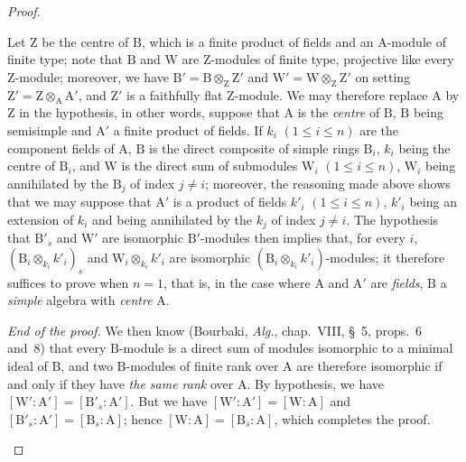\begin{proof}
\begin{env}[2.5.8.8]
Let $\mathrm{Z}$ be the centre of $\mathrm{B}$, which is a finite product
of fields and an $\mathrm{A}$-module of finite type; note that
$\mathrm{B}$ and $\mathrm{W}$ are $\mathrm{Z}$-modules of finite type,
projective like every $\mathrm{Z}$-module; moreover, we have
$\mathrm{B}'=\mathrm{B}\otimes_{\mathrm{Z}}\mathrm{Z}'$ and
$\mathrm{W}'=\mathrm{W}\otimes_{\mathrm{Z}}\mathrm{Z}'$ on setting
$\mathrm{Z}'=\mathrm{Z}\otimes_{\mathrm{A}}\mathrm{A}'$, and
$\mathrm{Z}'$ is a faithfully flat $\mathrm{Z}$-module. We may therefore
replace $\mathrm{A}$ by $\mathrm{Z}$ in the hypothesis, in other words,
suppose that $\mathrm{A}$ is the \emph{centre} of $\mathrm{B}$,
$\mathrm{B}$ being semisimple and $\mathrm{A}'$ a finite product of
fields. If $k_i$ $(1\leq i\leq n)$ are the component fields of
$\mathrm{A}$, $\mathrm{B}$ is the direct composite of simple rings
$\mathrm{B}_i$, $k_i$ being the centre of $\mathrm{B}_i$, and
$\mathrm{W}$ is the direct sum of submodules $\mathrm{W}_i$
$(1\leq i\leq n)$, $\mathrm{W}_i$ being annihilated by the $\mathrm{B}_j$
of index $j\neq i$; moreover, the reasoning made above shows that we may
suppose that $\mathrm{A}'$ is a product of fields $k'_i$
$(1\leq i\leq n)$, $k'_i$ being an extension of $k_i$ and being
annihilated by the $k_j$ of index $j\neq i$. The hypothesis that
$\mathrm{B}'_s$ and $\mathrm{W}'$ are isomorphic $\mathrm{B}'$-modules
then implies that, for every $i$,
$(\mathrm{B}_i\otimes_{k_i}k'_i)_s$ and
$\mathrm{W}_i\otimes_{k_i}k'_i$ are isomorphic
$(\mathrm{B}_i\otimes_{k_i}k'_i)$-modules; it therefore suffices to prove
 when $n=1$, that is, in the case where $\mathrm{A}$ and
$\mathrm{A}'$ are \emph{fields}, $\mathrm{B}$ a \emph{simple} algebra with
\emph{centre} $\mathrm{A}$.
\end{env}

\begin{env}[2.5.8.9]
\label{IV.2.5.8.9}
\emph{End of the proof.} We then know (Bourbaki,
\emph{Alg.}, chap.~VIII, \S~5, props.~6 and~8) that every
$\mathrm{B}$-module is a direct sum of modules isomorphic to a minimal
ideal of $\mathrm{B}$, and two $\mathrm{B}$-modules of finite rank over
$\mathrm{A}$ are therefore isomorphic if and only if they have \emph{the
same rank} over $\mathrm{A}$. By hypothesis, we have
$[\mathrm{W}':\mathrm{A}']=[\mathrm{B}'_s:\mathrm{A}']$. But we have
$[\mathrm{W}':\mathrm{A}']=[\mathrm{W}:\mathrm{A}]$ and
$[\mathrm{B}'_s:\mathrm{A}']=[\mathrm{B}_s:\mathrm{A}]$; hence
$[\mathrm{W}:\mathrm{A}]=[\mathrm{B}_s:\mathrm{A}]$, which completes
the proof.
\end{env}
\end{proof}

